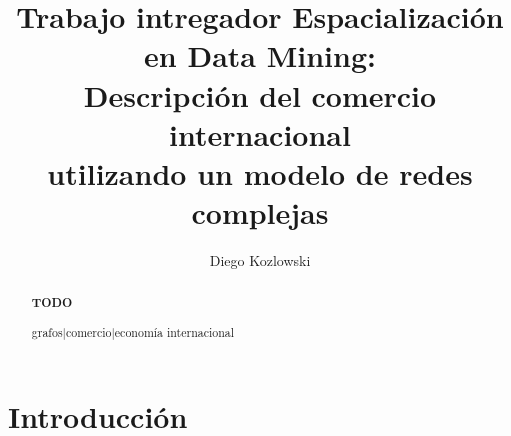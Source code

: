\documentclass[runningheads,a4paper]{llncs}
\newcommand{\keywords}[1]{\par\addvspace\baselineskip
\noindent\keywordname\enspace\ignorespaces#1}
\begin{document}
\mainmatter  %

\title{Trabajo intregador Espacialización en Data Mining:\\Descripción del comercio internacional\\utilizando un modelo de redes complejas}


%
%
\author{Diego Kozlowski}
%


%
%

\maketitle


\begin{abstract}
\textbf{TODO}
\keywords{grafos|comercio|economía internacional}
\end{abstract}


\section{Introducción}
\end{document}
